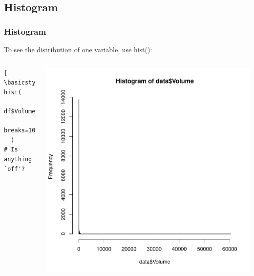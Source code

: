 
\subsection{Histogram}

\begin{frame}
	\frametitle{Histogram}
To see the distribution of one variable, use \ttfamily hist(): \normalfont

    \begin{columns}
  \begin{lstlisting}[ \basicstyle=\small]
hist(
  df$Volume, 
  breaks=1000
  )
# Is anything `off'?
  \end{lstlisting}

        \begin{center}
           \includegraphics[scale=0.33]{images/histogram.pdf}
        \end{center}  
\end{columns}

\newpage      


\end{frame}
